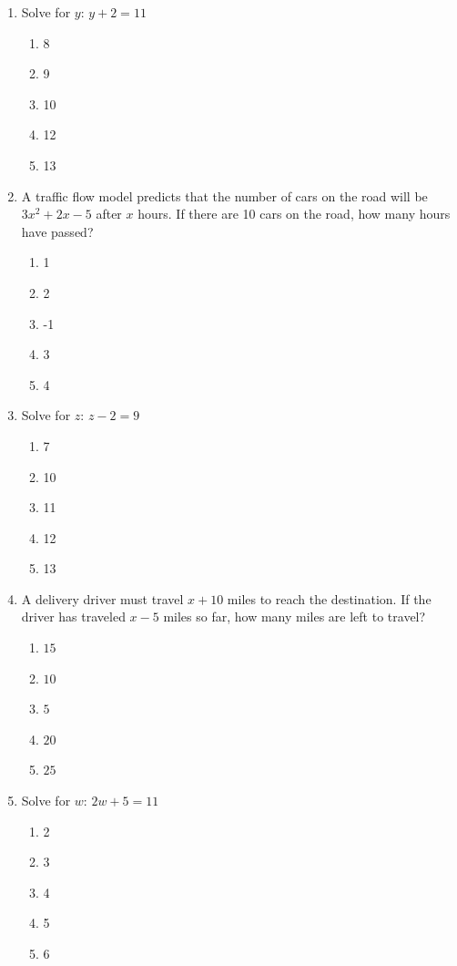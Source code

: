 \documentclass[10pt]{article}
\begin{document}
\begin{multicols}{2}
\begin{enumerate}[label=\textbf{Q\arabic*.}, leftmargin=*, itemsep=6pt, parsep=0pt]
  \item \small Solve for $y$: $y + 2 = 11$
  \begin{enumerate}[label=(\Alph*), leftmargin=0.6cm, nosep, itemsep=2pt]
    \item 8
    \item 9
    \item 10
    \item 12
    \item 13
  \end{enumerate}

  \item \small A traffic flow model predicts that the number of cars on the road will be $3x^2 + 2x - 5$ after $x$ hours. If there are 10 cars on the road, how many hours have passed?
  \begin{enumerate}[label=(\Alph*), leftmargin=0.6cm, nosep, itemsep=2pt]
    \item 1
    \item 2
    \item -1
    \item 3
    \item 4
  \end{enumerate}

  \item \small Solve for $z$: $z - 2 = 9$
  \begin{enumerate}[label=(\Alph*), leftmargin=0.6cm, nosep, itemsep=2pt]
    \item 7
    \item 10
    \item 11
    \item 12
    \item 13
  \end{enumerate}

  \item \small A delivery driver must travel $x + 10$ miles to reach the destination. If the driver has traveled $x - 5$ miles so far, how many miles are left to travel?
  \begin{enumerate}[label=(\Alph*), leftmargin=0.6cm, nosep, itemsep=2pt]
    \item $15$
    \item $10$
    \item $5$
    \item $20$
    \item $25$
  \end{enumerate}

  \item \small Solve for $w$: $2w + 5 = 11$
  \begin{enumerate}[label=(\Alph*), leftmargin=0.6cm, nosep, itemsep=2pt]
    \item 2
    \item 3
    \item 4
    \item 5
    \item 6
  \end{enumerate}

\end{enumerate}
\end{multicols}
\end{document}
